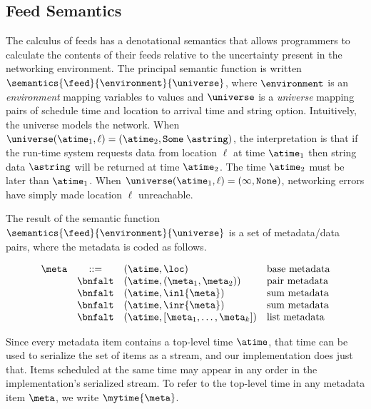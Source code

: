 %

\subsection{Feed Semantics}

The calculus of feeds has a denotational semantics that allows
programmers to calculate the contents of their feeds relative to
the uncertainty present in the networking environment.  The
principal semantic function is written
$\semantics{\feed}{\environment}{\universe}$,
where  $\environment$ is an {\em environment} mapping variables to values
and $\universe$ is a {\em universe} mapping pairs of
schedule time and location to arrival time and string option.
Intuitively, the universe models the network.
When $\universe (\atime_1, \ell) = (\atime_2, \mathtt{Some} \; \astring)$,
 the interpretation is that if the run-time system requests data
from location $\ell$ at time $\atime_1$ then string data $\astring$
will be returned at time $\atime_2$.  The time $\atime_2$ must be
later than $\atime_1$.
When $\universe (\atime_1, \ell) = (\infty, \mathtt{None})$,
networking errors have simply made location $\ell$ unreachable.

The result of the semantic function 
$\semantics{\feed}{\environment}{\universe}$
is a set of metadata/data pairs, where the 
metadata is coded as follows.

\[
\begin{array}{lcll} 
\meta & ::=     
& (\atime,\loc) & \mbox{base metadata} \\
& \bnfalt & (\atime,(\meta_1,\meta_2)) & \mbox{pair metadata} \\
& \bnfalt & (\atime,\inl{\meta}) & \mbox{sum metadata} \\
& \bnfalt & (\atime,\inr{\meta}) & \mbox{sum metadata} \\
& \bnfalt & (\atime,[\meta_1,\ldots,\meta_k]) & \mbox{list metadata} \\
\end{array}
\]  

Since every metadata item contains a top-level time $\atime$, that
time can be used to serialize the set of items as a stream, and 
our implementation does just that.  Items scheduled at the
same time may appear in any order in the implementation's
serialized stream.  To refer to the top-level time in any metadata
item $\meta$, we write $\mytime{\meta}$. 

